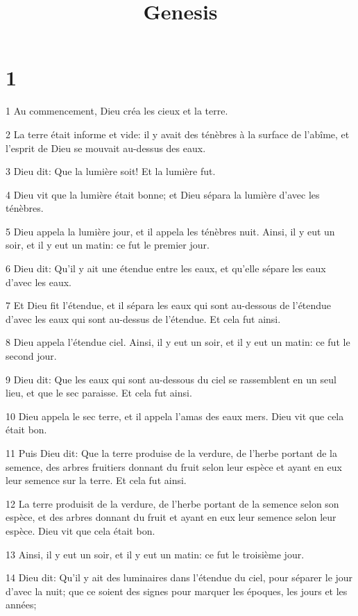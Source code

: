 

\title{Genesis}


\chapter{1}

\par 1 Au commencement, Dieu créa les cieux et la terre.
\par 2 La terre était informe et vide: il y avait des ténèbres à la surface de l'abîme, et l'esprit de Dieu se mouvait au-dessus des eaux.
\par 3 Dieu dit: Que la lumière soit! Et la lumière fut.
\par 4 Dieu vit que la lumière était bonne; et Dieu sépara la lumière d'avec les ténèbres.
\par 5 Dieu appela la lumière jour, et il appela les ténèbres nuit. Ainsi, il y eut un soir, et il y eut un matin: ce fut le premier jour.
\par 6 Dieu dit: Qu'il y ait une étendue entre les eaux, et qu'elle sépare les eaux d'avec les eaux.
\par 7 Et Dieu fit l'étendue, et il sépara les eaux qui sont au-dessous de l'étendue d'avec les eaux qui sont au-dessus de l'étendue. Et cela fut ainsi.
\par 8 Dieu appela l'étendue ciel. Ainsi, il y eut un soir, et il y eut un matin: ce fut le second jour.
\par 9 Dieu dit: Que les eaux qui sont au-dessous du ciel se rassemblent en un seul lieu, et que le sec paraisse. Et cela fut ainsi.
\par 10 Dieu appela le sec terre, et il appela l'amas des eaux mers. Dieu vit que cela était bon.
\par 11 Puis Dieu dit: Que la terre produise de la verdure, de l'herbe portant de la semence, des arbres fruitiers donnant du fruit selon leur espèce et ayant en eux leur semence sur la terre. Et cela fut ainsi.
\par 12 La terre produisit de la verdure, de l'herbe portant de la semence selon son espèce, et des arbres donnant du fruit et ayant en eux leur semence selon leur espèce. Dieu vit que cela était bon.
\par 13 Ainsi, il y eut un soir, et il y eut un matin: ce fut le troisième jour.
\par 14 Dieu dit: Qu'il y ait des luminaires dans l'étendue du ciel, pour séparer le jour d'avec la nuit; que ce soient des signes pour marquer les époques, les jours et les années;

